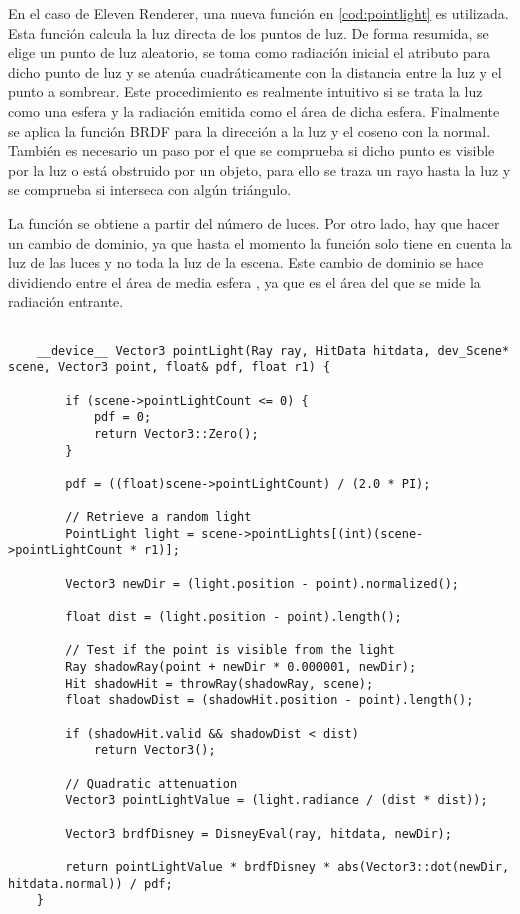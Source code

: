 En el caso de Eleven Renderer, una nueva función  en \autoref{cod:pointlight} es utilizada. Esta función calcula la luz directa de los puntos de luz. De forma resumida, se elige un punto de luz aleatorio, se toma como radiación inicial el atributo  para dicho punto de luz y se atenúa cuadráticamente con la distancia entre la luz y el punto a sombrear. Este procedimiento es realmente intuitivo si se trata la luz como una esfera y la radiación emitida como el área de dicha esfera. Finalmente se aplica la función BRDF para la dirección a la luz y el coseno con la normal. También es necesario un paso por el que se comprueba si dicho punto es visible por la luz o está obstruido por un objeto, para ello se traza un rayo hasta la luz y se comprueba si interseca con algún triángulo.

La función  se obtiene a partir del número de luces. Por otro lado, hay que hacer un cambio de dominio, ya que hasta el momento la función  solo tiene en cuenta la luz de las luces y no toda la luz de la escena. Este cambio de dominio se hace dividiendo entre el área de media esfera , ya que es el área del que se mide la radiación entrante.

\begin{minipage}[c]{0.95\textwidth}
\begin{lstlisting}[label={cod:pointlight}, caption={Código de iluminación por luces puntuales}]
	
	__device__ Vector3 pointLight(Ray ray, HitData hitdata, dev_Scene* scene, Vector3 point, float& pdf, float r1) {

		if (scene->pointLightCount <= 0) {
			pdf = 0;
			return Vector3::Zero();
		}

		pdf = ((float)scene->pointLightCount) / (2.0 * PI);

		// Retrieve a random light
		PointLight light = scene->pointLights[(int)(scene->pointLightCount * r1)];
		
		Vector3 newDir = (light.position - point).normalized();
		
		float dist = (light.position - point).length();

		// Test if the point is visible from the light
		Ray shadowRay(point + newDir * 0.000001, newDir);
		Hit shadowHit = throwRay(shadowRay, scene);
		float shadowDist = (shadowHit.position - point).length();

		if (shadowHit.valid && shadowDist < dist)
			return Vector3();

		// Quadratic attenuation
		Vector3 pointLightValue = (light.radiance / (dist * dist));

		Vector3 brdfDisney = DisneyEval(ray, hitdata, newDir);

		return pointLightValue * brdfDisney * abs(Vector3::dot(newDir, hitdata.normal)) / pdf;
	}
	
\end{lstlisting}
\end{minipage}

